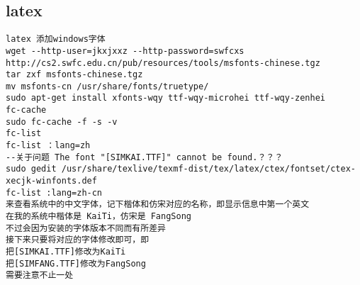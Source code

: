 \subsection{latex}

\begin{verbatim}
latex 添加windows字体
wget --http-user=jkxjxxz --http-password=swfcxs http://cs2.swfc.edu.cn/pub/resources/tools/msfonts-chinese.tgz
tar zxf msfonts-chinese.tgz
mv msfonts-cn /usr/share/fonts/truetype/
sudo apt-get install xfonts-wqy ttf-wqy-microhei ttf-wqy-zenhei
fc-cache
sudo fc-cache -f -s -v
fc-list
fc-list ：lang=zh
--关于问题 The font "[SIMKAI.TTF]" cannot be found.？？？
sudo gedit /usr/share/texlive/texmf-dist/tex/latex/ctex/fontset/ctex-xecjk-winfonts.def
fc-list :lang=zh-cn
来查看系统中的中文字体，记下楷体和仿宋对应的名称，即显示信息中第一个英文
在我的系统中楷体是 KaiTi，仿宋是 FangSong
不过会因为安装的字体版本不同而有所差异
接下来只要将对应的字体修改即可，即
把[SIMKAI.TTF]修改为KaiTi
把[SIMFANG.TTF]修改为FangSong
需要注意不止一处


\end{verbatim}
